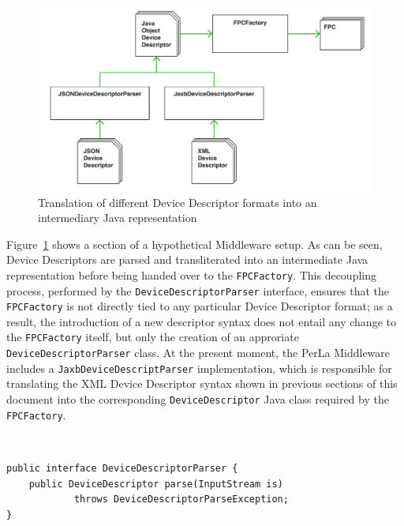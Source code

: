 \begin{figure}[h!]
    \center
    \includegraphics[width=\textwidth]{imgs/descriptorparser.pdf}
    \caption{Translation of different Device Descriptor formats into an
    intermediary Java representation}
    \label{fig:descriptorparser}
\end{figure}


Figure~\ref{fig:descriptorparser} shows a section of a hypothetical Middleware
setup. As can be seen, Device Descriptors are parsed and transliterated into
an intermediate Java representation before being handed over to the
\texttt{FPCFactory}. This decoupling process, performed by the
\texttt{DeviceDescriptorParser} interface, ensures that the \texttt{FPCFactory}
is not directly tied to any particular Device Descriptor format; as a result,
the introduction of a new descriptor syntax does not entail any change to the
\texttt{FPCFactory} itself, but only the creation of an approriate
\texttt{DeviceDescriptorParser} class. At the present moment, the PerLa
Middleware includes a \texttt{JaxbDeviceDescriptParser} implementation, which
is responsible for translating the XML Device Descriptor syntax shown in
previous sections of this document into the corresponding
\texttt{DeviceDescriptor} Java class required by the \texttt{FPCFactory}.

~\\
\lstset{language=java}
\begin{lstlisting}[caption={The DeviceDescriptorParser interface. The only
method exposed by this module is responsible for converting Device Descriptors
received from the sensing nodes into an intermediate Java object
representation.}]
public interface DeviceDescriptorParser {
    public DeviceDescriptor parse(InputStream is)
            throws DeviceDescriptorParseException;
}
\end{lstlisting}


